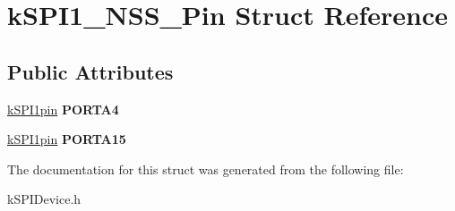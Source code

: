 \hypertarget{structkSPI1__NSS__Pin}{}\section{k\+S\+P\+I1\+\_\+\+N\+S\+S\+\_\+\+Pin Struct Reference}
\label{structkSPI1__NSS__Pin}
\subsection*{Public Attributes}
\begin{DoxyCompactItemize}
\item 
\hyperlink{structkSPI1pin}{k\+S\+P\+I1pin} {\bfseries P\+O\+R\+T\+A4}\hypertarget{structkSPI1__NSS__Pin_a270ede5256c319cba8bb927534ee0cab}{}\label{structkSPI1__NSS__Pin_a270ede5256c319cba8bb927534ee0cab}

\item 
\hyperlink{structkSPI1pin}{k\+S\+P\+I1pin} {\bfseries P\+O\+R\+T\+A15}\hypertarget{structkSPI1__NSS__Pin_ad69180293da9e411bd88eb9a270d191a}{}\label{structkSPI1__NSS__Pin_ad69180293da9e411bd88eb9a270d191a}

\end{DoxyCompactItemize}


The documentation for this struct was generated from the following file\+:\begin{DoxyCompactItemize}
\item 
k\+S\+P\+I\+Device.\+h\end{DoxyCompactItemize}
